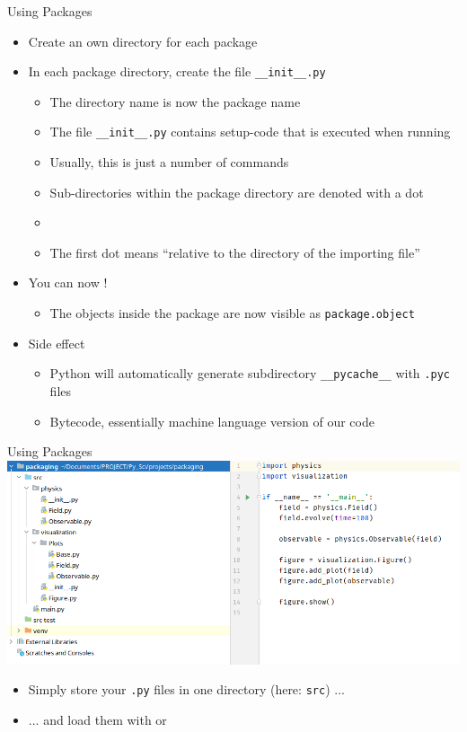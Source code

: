 
\begin{frame}{Using Packages}
%
\begin{itemize}
\item Create an own directory for each package
\item In each package directory, create the file \texttt{\_\_init\_\_.py}
	\begin{itemize}
	\item The directory name is now the package name
	\item The file \texttt{\_\_init\_\_.py} contains setup-code that is executed when running 
	\item Usually, this is just a number of  commands
	\item Sub-directories within the package directory are denoted with a dot
	\item {}
	\item The first dot means \enquote{relative to the directory of the importing file}
	\end{itemize}
\item You can now !
	\begin{itemize}
	\item The objects inside the package are now visible as \texttt{package.object}
	\end{itemize}
\item Side effect
	\begin{itemize}
	\item Python will automatically generate subdirectory \texttt{\_\_pycache\_\_} with \texttt{.pyc} files
	\item Bytecode, essentially machine language version of our code
	\end{itemize}
\end{itemize}
%
\end{frame}


\begin{frame}{Using Packages}
%
\includegraphics[width=\linewidth]{./gfx/01-packages}
%
\begin{itemize}
\item Simply store your \texttt{.py} files in one directory (here: \texttt{src}) ...
\item ... and load them with  or 
\end{itemize}
%
\end{frame}

